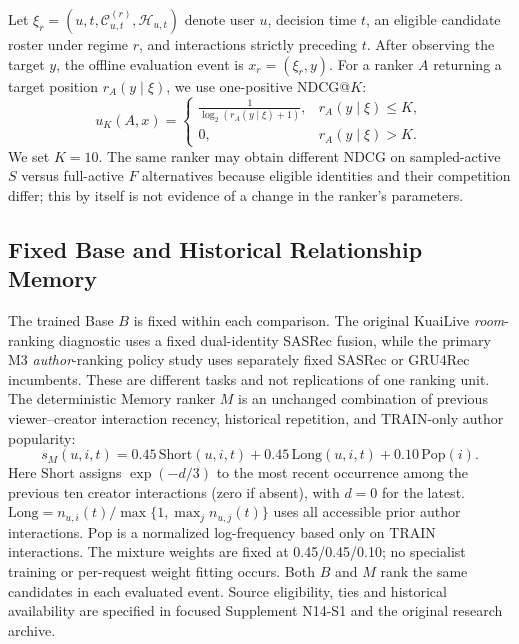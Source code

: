 \documentclass[preprint,12pt]{elsarticle}
\begin{document}
Let $\xi_r=(u,t,\mathcal{C}^{(r)}_{u,t},\mathcal{H}_{u,t})$ denote user $u$, decision time $t$, an eligible candidate roster under regime $r$, and interactions strictly preceding $t$. After observing the target $y$, the offline evaluation event is $x_r=(\xi_r,y)$. For a ranker $A$ returning a target position $r_A(y\mid\xi)$, we use one-positive NDCG@$K$:
\begin{equation}
    u_K(A,x)=
    \begin{cases}
        \displaystyle \frac{1}{\log_2\!\left(r_A(y\mid\xi)+1\right)}, & r_A(y\mid\xi)\le K,\\[6pt]
        0, & r_A(y\mid\xi)>K.
    \end{cases}
    \label{eq:event-ndcg}
\end{equation}
We set $K=10$. The same ranker may obtain different NDCG on sampled-active $S$ versus full-active $F$ alternatives because eligible identities and their competition differ; this by itself is not evidence of a change in the ranker's parameters.

\subsection{Fixed Base and Historical Relationship Memory}
\label{sec:framework-base}
\label{sec:framework-memory}

The trained Base $B$ is fixed within each comparison. The original KuaiLive \emph{room}-ranking diagnostic uses a fixed dual-identity SASRec fusion, while the primary M3 \emph{author}-ranking policy study uses separately fixed SASRec or GRU4Rec incumbents. These are different tasks and not replications of one ranking unit. The deterministic Memory ranker $M$ is an unchanged combination of previous viewer--creator interaction recency, historical repetition, and TRAIN-only author popularity:
\begin{equation}
s_M(u,i,t)=
0.45\,\mathrm{Short}(u,i,t)
+0.45\,\mathrm{Long}(u,i,t)
+0.10\,\mathrm{Pop}(i).
\label{eq:memory-scoring}
\end{equation}
Here $\mathrm{Short}$ assigns $\exp(-d/3)$ to the most recent occurrence among the previous ten creator interactions (zero if absent), with $d=0$ for the latest. $\mathrm{Long}=n_{u,i}(t)/\max\{1,\max_j n_{u,j}(t)\}$ uses all accessible prior author interactions. $\mathrm{Pop}$ is a normalized log-frequency based only on TRAIN interactions. The mixture weights are fixed at 0.45/0.45/0.10; no specialist training or per-request weight fitting occurs. Both $B$ and $M$ rank the same candidates in each evaluated event. Source eligibility, ties and historical availability are specified in focused Supplement N14-S1 and the original research archive.
\end{document}
